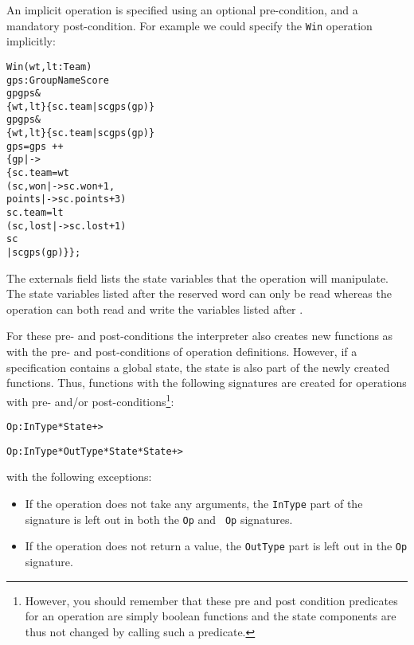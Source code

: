 \documentclass[\pformat,12pt]{article}
\begin{document}
\begin{description}
An implicit operation is specified using an optional pre-condition,
and a mandatory post-condition. For example we could specify the
\texttt{Win} operation implicitly:
\begin{alltt}
  Win (wt,lt: Team)
   gps :  GroupName  Score
    gp  gps & 
          \{wt,lt\}  \{sc.team | sc  gps(gp)\}
    gp  gps &
         \{wt,lt\}  \{sc.team | sc  gps(gp)\}
          gps = gps~ ++ 
                       \{ gp |-> 
                         \{ sc.team = wt
                           (sc, won |-> sc.won + 1,
                                     points |-> sc.points + 3)
                           sc.team = lt
                          (sc, lost |-> sc.lost + 1)
                           sc 
                     | sc  gps(gp)\}\};
\end{alltt}

The externals field lists the 
state
variables that the
operation will manipulate. The 
state
variables listed after the reserved
word  can only be read whereas the operation can both read and
write the variables listed after . 
 
For these pre- and post-conditions the interpreter also
creates new functions as with the pre- and post-conditions of operation
definitions.  However, if a specification contains a global state, the
state is also part of the newly created functions. Thus, functions
with the following signatures are created for operations with pre-
and/or post-conditions\footnote{However, you should remember that
these pre and post condition predicates for an operation are simply
boolean functions and the state components are thus not changed by
calling such a predicate.}:
\begin{alltt}
  Op : InType * State +> 

  Op : InType * OutType * State * State +> 
\end{alltt}
with the following exceptions:
\begin{itemize}
\item If the operation does not take any arguments, the {\tt InType} part
  of the signature is left out in both the {\tt {}Op} and {\tt
    Op} signatures.

\item If the operation does not return a value, the {\tt OutType} part is
  left out in the {\tt {}Op} signature.


\end{itemize}
\end{description}
\end{document}
